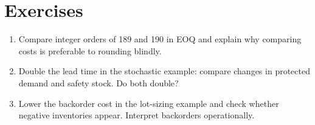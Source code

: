 \section{Exercises}
\begin{enumerate}
\item Compare integer orders of 189 and 190 in EOQ and explain why comparing
costs is preferable to rounding blindly.
\item Double the lead time in the stochastic example: compare changes in
protected demand and safety stock. Do both double?
\item Lower the backorder cost in the lot-sizing example and check whether
negative inventories appear. Interpret backorders operationally.
\end{enumerate}
